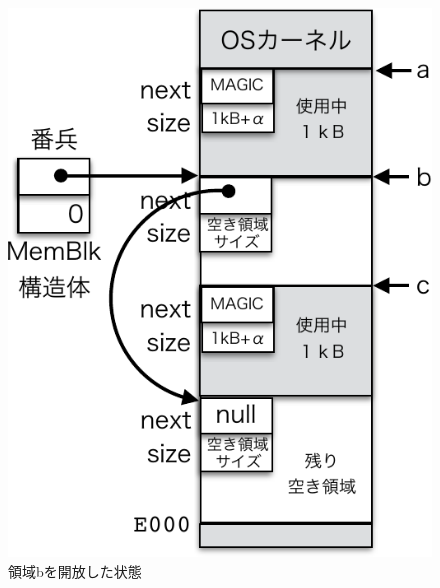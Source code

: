 \begin{figure}[btp]
\begin{center}
\begin{minipage}{0.49\columnwidth}
\includegraphics[scale=0.66]{Fig/mmFree1-crop.pdf}
\caption{領域bを開放した状態}\label{fig:mmFree1}
\end{minipage}
\begin{minipage}{0.49\columnwidth}

\end{minipage}
\end{center}
\end{figure}
